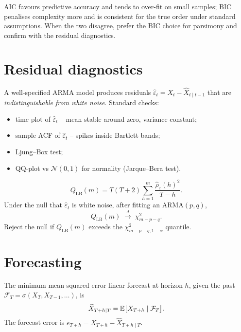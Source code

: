 \begin{rembox}
AIC favours predictive accuracy and tends to over-fit on small
samples; BIC penalises complexity more and is consistent for
the true order under standard assumptions. When the two disagree,
prefer the BIC choice for parsimony and confirm with the residual
diagnostics.
\end{rembox}

\section{Residual diagnostics}
\label{sec:diagnostics}

\begin{rembox}
A well-specified ARMA model produces residuals
$\widehat\varepsilon_t = X_t - \widehat X_{t \mid t-1}$ that are
\emph{indistinguishable from white noise}. Standard checks:
\begin{itemize}
  \item time plot of $\widehat\varepsilon_t$ -- mean stable around
        zero, variance constant;
  \item sample ACF of $\widehat\varepsilon_t$ -- spikes inside
        Bartlett bands;
  \item Ljung--Box test;
  \item QQ-plot vs $\mathcal N(0, 1)$ for normality (Jarque--Bera
        test).
\end{itemize}
\end{rembox}

\begin{thbox}
\label{th:lb-residuals}
\[
  Q_{\text{LB}}(m)
  = T(T + 2) \sum_{h = 1}^{m}
        \frac{\widehat\rho_{\widehat\varepsilon}(h)^2}{T - h}.
\]
Under the null that $\widehat\varepsilon_t$ is white noise, after
fitting an ARMA$(p, q)$,
\[
  Q_{\text{LB}}(m) \;\xrightarrow{d}\; \chi^2_{m - p - q}.
\]
Reject the null if $Q_{\text{LB}}(m)$ exceeds the
$\chi^2_{m - p - q, 1 - \alpha}$ quantile.
\end{thbox}

\section{Forecasting}
\label{sec:forecasting}

\begin{defbox}
\label{def:forecast}
The minimum mean-squared-error linear forecast at horizon $h$,
given the past $\mathcal F_T = \sigma(X_T, X_{T-1}, \dots)$, is
\[
  \widehat X_{T + h \mid T}
  = \mathbb{E}\bigl[X_{T + h} \mid \mathcal F_T \bigr].
\]
The forecast error is
$e_{T + h} = X_{T + h} - \widehat X_{T + h \mid T}$.
\end{defbox}

